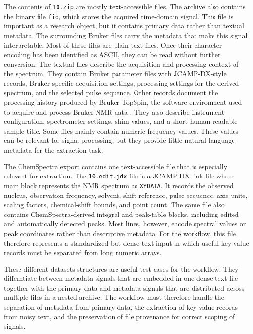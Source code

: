 The contents of \texttt{10.zip} are mostly text-accessible files.
The archive also contains the binary file \texttt{fid}, which stores the acquired time-domain signal.
This file is important as a research object, but it contains primary data rather than textual metadata.
The surrounding Bruker files carry the metadata that make this signal interpretable.
Most of these files are plain text files.
Once their character encoding has been identified as \ac{ASCII}, they can be read without further conversion.
The textual files describe the acquisition and processing context of the spectrum.
They contain Bruker parameter files with \ac{JCAMP-DX}-style records, Bruker-specific acquisition settings, processing settings for the derived spectrum, and the selected pulse sequence.
Other records document the processing history produced by Bruker TopSpin, the software environment used to acquire and process Bruker \ac{NMR} data \cite{brukerTopSpin}.
They also describe instrument configuration, spectrometer settings, shim values, and a short human-readable sample title.
Some files mainly contain numeric frequency values.
These values can be relevant for signal processing, but they provide little natural-language metadata for the extraction task.

The ChemSpectra export contains one text-accessible file that is especially relevant for extraction.
The \texttt{10.edit.jdx} file is a \ac{JCAMP-DX} link file whose main block represents the \ac{NMR} spectrum as \texttt{XYDATA}.
It records the observed nucleus, observation frequency, solvent, shift reference, pulse sequence, axis units, scaling factors, chemical-shift bounds, and point count.
The same file also contains ChemSpectra-derived integral and peak-table blocks, including edited and automatically detected peaks.
Most lines, however, encode spectral values or peak coordinates rather than descriptive metadata.
For the workflow, this file therefore represents a standardized but dense text input in which useful key-value records must be separated from long numeric arrays.

These different datasets structures are useful test cases for the workflow.
They differntiate between metadata signals that are embedded in one dense text file together with the primary data and metadata signals that are distributed across multiple files in a nested archive.
The workflow must therefore handle the separation of metadata from primary data, the extraction of key-value records from noisy text, and the preservation of file provenance for correct scoping of signals.

